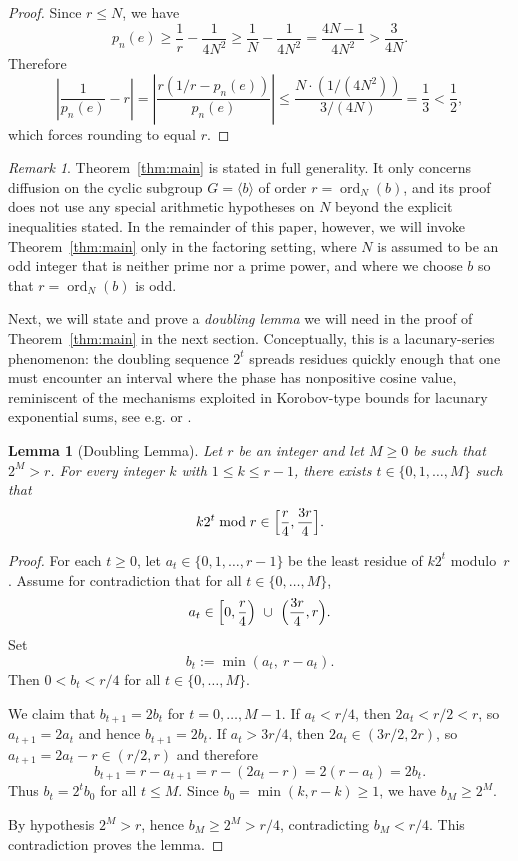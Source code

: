 \documentclass[11pt,reqno]{article}
\numberwithin{equation}{section}
\DeclareMathOperator{\ord}{ord}
\theoremstyle{plain}
\newtheorem{lemma}[theorem]{Lemma}
\theoremstyle{definition}
\theoremstyle{remark}
\newtheorem{remark}[theorem]{Remark}
\begin{document}
\begin{proof}
Since $r\le N$, we have
\[
p_n(e)\ge \frac{1}{r}-\frac{1}{4N^2}\ge \frac{1}{N}-\frac{1}{4N^2}=\frac{4N-1}{4N^2}>\frac{3}{4N}.
\]
Therefore
\[
\left|\frac{1}{p_n(e)}-r\right|
=\left|\frac{r(1/r-p_n(e))}{p_n(e)}\right|
\le \frac{N\cdot (1/(4N^2))}{3/(4N)}=\frac13<\frac12,
\]
which forces rounding to equal $r$.
\end{proof}
\begin{remark}\label{rem:scope-diffusion-thm}
Theorem~\ref{thm:main} is stated in full generality. It only concerns diffusion on the cyclic subgroup
$G=\langle b\rangle$ of order $r=\ord_N(b)$, and its proof does not use any special arithmetic
hypotheses on $N$ beyond the explicit inequalities stated.
In the remainder of this paper, however, we will invoke Theorem~\ref{thm:main} only in the
factoring setting, where $N$ is assumed to be an odd integer that is neither prime nor a prime
power, and where we choose $b$ so that $r=\ord_N(b)$ is odd.
\end{remark}
\medskip\noindent
Next, we will state and prove a \emph{doubling lemma} we will need in the proof of
Theorem~\ref{thm:main} in the next section. Conceptually, this is a lacunary-series phenomenon: the doubling sequence $2^t$
spreads residues quickly enough that one must encounter an interval where the phase has nonpositive cosine value, reminiscent of the mechanisms
exploited in Korobov-type bounds for lacunary exponential sums, see e.g. \cite{KM12} or \cite{Va19}.


\begin{lemma}[Doubling Lemma]\label{lem:middle-half}
Let $r$ be an integer and let $M\ge 0$ be such that $2^M>r$.
For every integer $k$ with $1\le k\le r-1$, there exists $t\in\{0,1,\dots,M\}$ such that
\[
  k2^t \bmod r \in \Bigl[\frac r4,\frac{3r}{4}\Bigr].
\]
\end{lemma}

\begin{proof}
For each $t\ge 0$, let $a_t\in\{0,1,\dots,r-1\}$ be the least residue of $k2^t$ modulo~$r$.
Assume for contradiction that for all $t\in\{0,\dots,M\}$,
\[
  a_t\in \Bigl[0,\frac r4\Bigr)\ \cup\ \Bigl(\frac{3r}{4},r\Bigr).
\]
Set
\[
  b_t:=\min(a_t,\ r-a_t).
\]
Then $0<b_t<r/4$ for all $t\in\{0,\dots,M\}$.

We claim that $b_{t+1}=2b_t$ for $t=0,\dots,M-1$.
If $a_t<r/4$, then $2a_t<r/2<r$, so $a_{t+1}=2a_t$ and hence $b_{t+1}=2b_t$.
If $a_t>3r/4$, then $2a_t\in(3r/2,2r)$, so $a_{t+1}=2a_t-r\in(r/2,r)$ and therefore
\[
  b_{t+1}=r-a_{t+1}=r-(2a_t-r)=2(r-a_t)=2b_t.
\]
Thus $b_t=2^t b_0$ for all $t\le M$. Since $b_0=\min(k,r-k)\ge 1$, we have $b_M\ge 2^M$.

By hypothesis $2^M>r$, hence $b_M\ge 2^M>r/4$, contradicting $b_M<r/4$.
This contradiction proves the lemma.
\end{proof}
\end{document}
